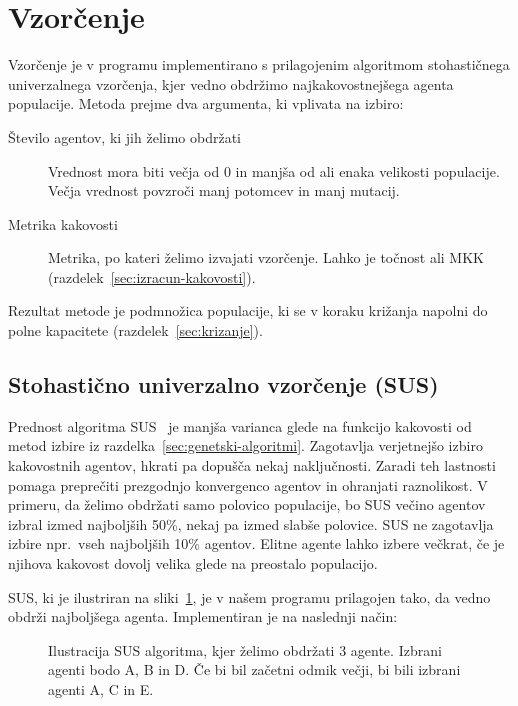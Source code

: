 \documentclass[a4paper,12pt,openright]{book}
\begin{document}
    \section{Vzorčenje}\label{sec:vzorcenje}
    Vzorčenje je v programu implementirano s prilagojenim algoritmom stohastičnega univerzalnega vzorčenja,
    kjer vedno obdržimo najkakovostnejšega agenta populacije.
    Metoda prejme dva argumenta, ki vplivata na izbiro:
    \begin{description}
        \item[Število agentov, ki jih želimo obdržati]{Vrednost mora biti večja od 0 in manjša od ali enaka velikosti populacije.
        Večja vrednost povzroči manj potomcev in manj mutacij.}
        \item[Metrika kakovosti]{Metrika, po kateri želimo izvajati vzorčenje. Lahko je točnost ali MKK (razdelek~\ref{sec:izracun-kakovosti}).}
    \end{description}

    Rezultat metode je podmnožica populacije, ki se v koraku križanja napolni do polne kapacitete (razdelek~\ref{sec:krizanje}).

    \subsection{Stohastično univerzalno vzorčenje (SUS)}\label{subsec:stohasticno-univerzalno-vzorcenje}
    Prednost algoritma SUS~\cite{inteligentni_sistemi_2010} je manjša varianca glede na funkcijo kakovosti od metod izbire iz razdelka~\ref{sec:genetski-algoritmi}.
    Zagotavlja verjetnejšo izbiro kakovostnih agentov, hkrati pa dopušča nekaj naključnosti.
    Zaradi teh lastnosti pomaga preprečiti prezgodnjo konvergenco agentov in ohranjati raznolikost.
    V primeru, da želimo obdržati samo polovico populacije, bo SUS večino agentov izbral izmed najboljših 50\%,
    nekaj pa izmed slabše polovice.
    SUS ne zagotavlja izbire npr.\ vseh najboljših 10\% agentov.
    Elitne agente lahko izbere večkrat, če je njihova kakovost dovolj velika glede na preostalo populacijo.

    SUS, ki je ilustriran na sliki~\ref{fig:sus}, je v našem programu prilagojen tako, da vedno obdrži najboljšega agenta.
    Implementiran je na naslednji način:

    \begin{figure}[H]
        \begin{center}
            
        \end{center}
        \caption{Ilustracija SUS algoritma, kjer želimo obdržati 3 agente. Izbrani agenti bodo A, B in D. Če bi bil začetni odmik
        večji, bi bili izbrani agenti A, C in E.}
        \label{fig:sus}
    \end{figure}
\end{document}
